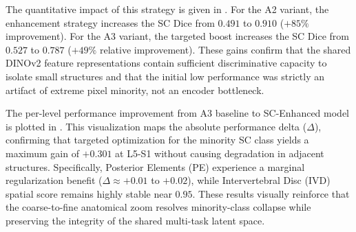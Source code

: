 \documentclass[journal]{IEEEtran}
\begin{document}
\begin{table}[htbp]
\centering
\caption{Impact of the targeted axial spinal canal (SC) enhancement protocol evaluated on the axial test set ($n=468$). $\Delta$ denotes the absolute Dice improvement, demonstrating the improvement of minority-class performance ($\text{SC}$) without degrading the spatial performance of adjacent structures ($\text{IVD}$, $\text{PE}$). Best post-enhancement values per variant are highlighted in \textbf{bold}.}
\label{tab:sc_enhanced_combined}
\end{table}

The quantitative impact of this strategy is given in . For the A2 variant, the enhancement strategy increases the SC Dice from $0.491$ to $0.910$ ($+85\%$ improvement). For the A3 variant, the targeted boost increases the SC Dice from $0.527$ to $0.787$ ($+49\%$ relative improvement). These gains confirm that the shared DINOv2 feature representations contain sufficient discriminative capacity to isolate small structures and that the initial low performance was strictly an artifact of extreme pixel minority, not an encoder bottleneck. 


The per-level performance improvement from A3 baseline to SC-Enhanced model is plotted in . This visualization maps the absolute performance delta ($\Delta$), confirming that targeted optimization for the minority SC class yields a maximum gain of $+0.301$ at L5-S1 without causing degradation in adjacent structures. Specifically, Posterior Elements (PE) experience a marginal regularization benefit ($\Delta \approx +0.01$ to $+0.02$), while Intervertebral Disc (IVD) spatial score remains highly stable near $0.95$. These results visually reinforce that the coarse-to-fine anatomical zoom resolves minority-class collapse while preserving the integrity of the shared multi-task latent space.
\end{document}
